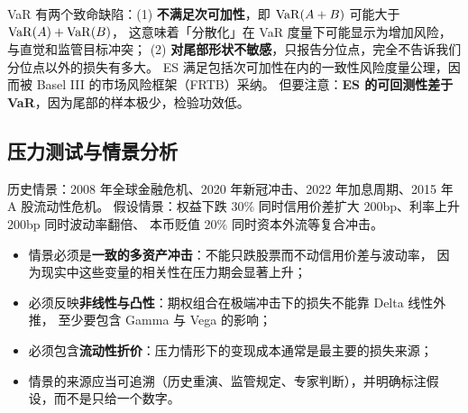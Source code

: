 \begin{keybox}
VaR 有两个致命缺陷：(1) \textbf{不满足次可加性}，即 $\operatorname{VaR}(A+B)$ 可能大于 $\operatorname{VaR}(A)+\operatorname{VaR}(B)$，
这意味着「分散化」在 VaR 度量下可能显示为增加风险，与直觉和监管目标冲突；
(2) \textbf{对尾部形状不敏感}，只报告分位点，完全不告诉我们分位点以外的损失有多大。
ES 满足包括次可加性在内的一致性风险度量公理，因而被 Basel III 的市场风险框架（FRTB）采纳。
但要注意：\textbf{ES 的可回测性差于 VaR}，因为尾部的样本极少，检验功效低。
\end{keybox}

\subsection{压力测试与情景分析}

历史情景：2008 年全球金融危机、2020 年新冠冲击、2022 年加息周期、2015 年 A 股流动性危机。
假设情景：权益下跌 30\% 同时信用价差扩大 200bp、利率上升 200bp 同时波动率翻倍、
本币贬值 20\% 同时资本外流等复合冲击。

\begin{appbox}[压力测试的工程要点]
\begin{itemize}[leftmargin=1.4em]
  \item 情景必须是\textbf{一致的多资产冲击}：不能只跌股票而不动信用价差与波动率，
        因为现实中这些变量的相关性在压力期会显著上升；
  \item 必须反映\textbf{非线性与凸性}：期权组合在极端冲击下的损失不能靠 Delta 线性外推，
        至少要包含 Gamma 与 Vega 的影响；
  \item 必须包含\textbf{流动性折价}：压力情形下的变现成本通常是最主要的损失来源；
  \item 情景的来源应当可追溯（历史重演、监管规定、专家判断），并明确标注假设，而不是只给一个数字。
\end{itemize}
\end{appbox}

